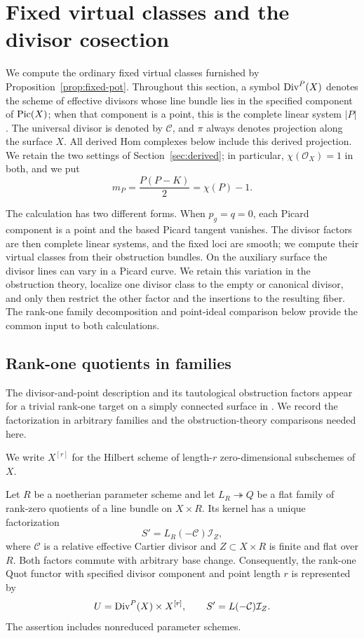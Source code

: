 \section{Fixed virtual classes and the divisor cosection}\label{sec:fixed}

We compute the ordinary fixed virtual classes furnished by
Proposition~\ref{prop:fixed-pot}.  Throughout this section, a symbol
\(\operatorname{Div}^{P}(X)\) denotes the scheme of effective divisors whose line bundle
lies in the specified component of \(\operatorname{Pic}(X)\); when that component is a
point, this is the complete linear system \(|P|\).
The universal divisor is denoted by \(\mathcal C\), and \(\pi\) always
denotes projection along the surface \(X\).
All derived Hom complexes below include this derived projection.
We retain the two settings of Section~\ref{sec:derived}; in particular,
\(\chi(\mathcal O_X)=1\) in both, and we put
\[
 m_P=\frac{P(P-K)}2=\chi(P)-1.
\]

The calculation has two different forms. When \(p_g=q=0\), each
Picard component is a point and the based Picard tangent vanishes.
The divisor factors are then complete linear systems, and the fixed
loci are smooth; we compute their virtual classes from their
obstruction bundles. On the auxiliary surface the divisor lines can
vary in a Picard curve. We retain this variation in the obstruction
theory, localize one divisor class to the empty or canonical divisor,
and only then restrict the other factor and the insertions to the
resulting fiber. The rank-one family decomposition and point-ideal
comparison below provide the common input to both calculations.

\subsection{Rank-one quotients in families}

The divisor-and-point description and its tautological obstruction
factors appear for a trivial rank-one target on a simply connected
surface in \cite[Section~5.2]{OP}. We record the factorization in
arbitrary families and the obstruction-theory comparisons needed here.

We write \(X^{[r]}\) for the Hilbert scheme of length-\(r\)
zero-dimensional subschemes of \(X\).

\begin{lemma}\label{lem:rank-one-family}
Let \(R\) be a noetherian parameter scheme and let
\(L_R\twoheadrightarrow Q\) be a flat family of rank-zero quotients of a
line bundle on \(X\times R\).  Its kernel has a unique factorization
\[
 S'=L_R(-\mathcal C)\mathcal I_Z,
\]
where \(\mathcal C\) is a relative effective Cartier divisor and
\(Z\subset X\times R\) is finite and flat over \(R\).
Both factors commute with arbitrary base change.  Consequently, the
rank-one Quot functor with specified divisor component and point length
\(r\) is represented by
\begin{equation}\label{fix:rank-one-product}
 U=\operatorname{Div}^P(X)\times X^{[r]},
 \qquad S'=L(-\mathcal C)\mathcal I_Z.
\end{equation}
The assertion includes nonreduced parameter schemes.
\end{lemma}

